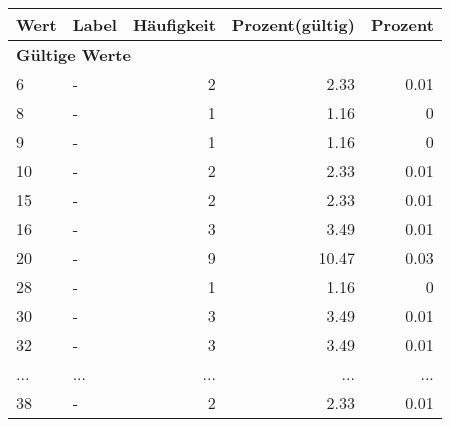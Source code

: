      \begin{longtable}{lXrrr}
     \toprule
     \textbf{Wert} & \textbf{Label} & \textbf{Häufigkeit} & \textbf{Prozent(gültig)} & \textbf{Prozent} \\
     \endhead
     \midrule
     \multicolumn{5}{l}{\textbf{Gültige Werte}}\\
        6 & \multicolumn{1}{X}{-} & %
          \num{2} &
          \num[round-mode=places,round-precision=2]{2.33} &
          \num[round-mode=places,round-precision=2]{0.01} \\
        8 & \multicolumn{1}{X}{-} & %
          \num{1} &
          \num[round-mode=places,round-precision=2]{1.16} &
          \num[round-mode=places,round-precision=2]{0} \\
        9 & \multicolumn{1}{X}{-} & %
          \num{1} &
          \num[round-mode=places,round-precision=2]{1.16} &
          \num[round-mode=places,round-precision=2]{0} \\
        10 & \multicolumn{1}{X}{-} & %
          \num{2} &
          \num[round-mode=places,round-precision=2]{2.33} &
          \num[round-mode=places,round-precision=2]{0.01} \\
        15 & \multicolumn{1}{X}{-} & %
          \num{2} &
          \num[round-mode=places,round-precision=2]{2.33} &
          \num[round-mode=places,round-precision=2]{0.01} \\
        16 & \multicolumn{1}{X}{-} & %
          \num{3} &
          \num[round-mode=places,round-precision=2]{3.49} &
          \num[round-mode=places,round-precision=2]{0.01} \\
        20 & \multicolumn{1}{X}{-} & %
          \num{9} &
          \num[round-mode=places,round-precision=2]{10.47} &
          \num[round-mode=places,round-precision=2]{0.03} \\
        28 & \multicolumn{1}{X}{-} & %
          \num{1} &
          \num[round-mode=places,round-precision=2]{1.16} &
          \num[round-mode=places,round-precision=2]{0} \\
        30 & \multicolumn{1}{X}{-} & %
          \num{3} &
          \num[round-mode=places,round-precision=2]{3.49} &
          \num[round-mode=places,round-precision=2]{0.01} \\
        32 & \multicolumn{1}{X}{-} & %
          \num{3} &
          \num[round-mode=places,round-precision=2]{3.49} &
          \num[round-mode=places,round-precision=2]{0.01} \\
       ... & ... & ... & ... & ... \\
        38 & \multicolumn{1}{X}{-} & %
          \num{2} &
          \num[round-mode=places,round-precision=2]{2.33} &
          \num[round-mode=places,round-precision=2]{0.01} \\


\end{longtable}

